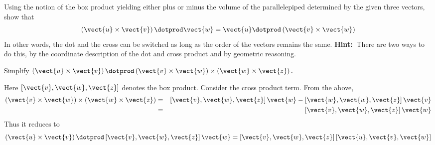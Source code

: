 \begin{enumialphparenastyle}
\begin{ex} Using the notion of the box product yielding either plus or minus the
volume of the parallelepiped determined by the given three vectors, show
that
\begin{equation*}
\left( \vect{u}\times \vect{v}\right) \dotprod \vect{w}=\vect{u}\dotprod \left(
\vect{v}\times \vect{w}\right)
\end{equation*}
In other words, the dot and the cross can be switched as long as the order
of the vectors remains the same. \textbf{Hint:\ }There are two ways to do
this, by the coordinate description of the dot and cross product and by
geometric reasoning. 
\end{ex}

\begin{ex} Simplify $\left( \vect{u}\times \vect{v}\right) \dotprod \left( 
\vect{v}\times \vect{w}\right) \times \left( \vect{w}\times \vect{z}\right) .$
\begin{sol}
Here $\left[ \vect{v},\vect{w},\vect{z}\right]$ denotes the box product. Consider the cross product term. From the above,
\begin{eqnarray*}
\left( \vect{v}\times \vect{w}\right) \times \left( \vect{w}\times \vect{z}\right) &=& 
\left[ \vect{v},\vect{w},\vect{z}\right] \vect{w}-\left[ \vect{w},\vect{w},\vect{z}\right] \vect{v} \\
&=&\left[ \vect{v},\vect{w},\vect{z}\right] \vect{w}
\end{eqnarray*}
Thus it reduces to
\[
\left( \vect{u}\times \vect{v}\right) \dotprod \left[ \vect{v},\vect{w},\vect{z}\right] \vect{w}=\left[ \vect{v},\vect{w},\vect{z}\right] \left[ \vect{u},\vect{v},\vect{w}\right]
\]
\end{sol}
\end{ex}


\end{enumialphparenastyle}
